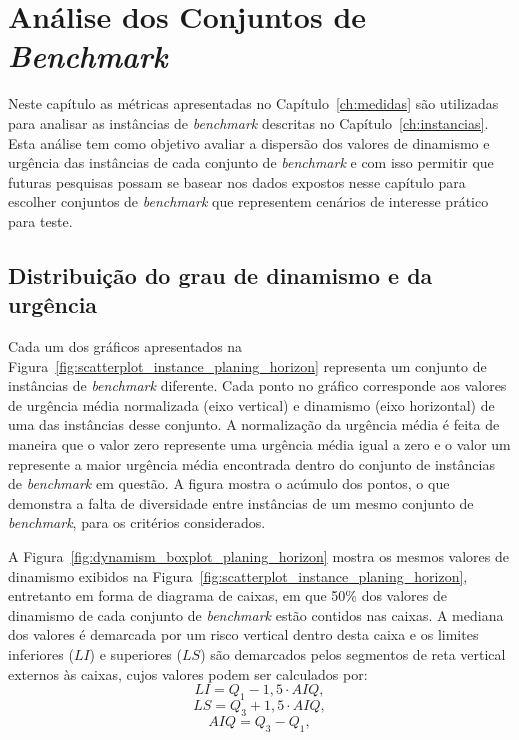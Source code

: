 \chapter{Análise dos Conjuntos de \textit{Benchmark}}\label{ch:analise}

Neste capítulo as métricas apresentadas no Capítulo~\ref{ch:medidas} são 
utilizadas para analisar as instâncias de \textit{benchmark} descritas no
Capítulo~\ref{ch:instancias}. 
Esta análise tem como objetivo avaliar a dispersão dos valores de dinamismo e 
urgência das instâncias de cada conjunto de \textit{benchmark} e com isso 
permitir que futuras pesquisas possam se basear nos
dados expostos nesse capítulo para escolher conjuntos de \textit{benchmark} que
representem cenários de interesse prático para teste.






\section{Distribuição do grau de dinamismo e da urgência}

Cada um dos gráficos apresentados na 
Figura~\ref{fig:scatterplot_instance_planing_horizon} representa um conjunto 
de instâncias de \textit{benchmark} diferente. 
Cada ponto no gráfico corresponde aos valores de urgência média normalizada 
(eixo vertical) e dinamismo (eixo horizontal) de uma das instâncias desse 
conjunto.
A normalização da urgência média é feita de maneira que o valor zero represente
uma urgência média igual a zero e o valor um represente a maior urgência média
encontrada dentro do conjunto de instâncias de \textit{benchmark} em questão.
A figura mostra o acúmulo dos pontos, o que demonstra a falta
de diversidade entre instâncias de um mesmo conjunto de \textit{benchmark},
para os critérios considerados.


A Figura~\ref{fig:dynamism_boxplot_planing_horizon} mostra os mesmos valores de
dinamismo exibidos na Figura~\ref{fig:scatterplot_instance_planing_horizon}, 
entretanto em forma de diagrama de caixas, em que 50\% dos valores de dinamismo
de cada conjunto de \textit{benchmark} estão contidos nas caixas.
A mediana dos valores é demarcada por um risco vertical dentro desta caixa e os
limites inferiores ($LI$) e superiores ($LS$) são demarcados pelos segmentos 
de reta vertical externos às caixas, cujos valores podem ser calculados 
por:
%
\begin{equation}
  LI = Q_1 - 1{,}5 \cdot AIQ,
\end{equation}
%
\begin{equation}
  LS = Q_3 + 1{,}5 \cdot AIQ,
\end{equation}
%
\begin{equation}
  AIQ = Q_3 - Q_1,
\end{equation}


